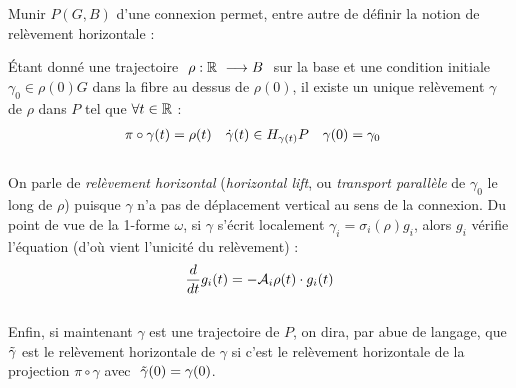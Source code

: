 Munir $P(G,B)$ d'une connexion permet, entre autre de définir la notion de relèvement horizontale :
\begin{definition}
	Étant donné une trajectoire $\ \rho : \R\ \lr B\ $ sur la base et une condition initiale $\gamma_0\in \rho(0)G$ dans la fibre au dessus de $\rho(0)$, il existe un unique relèvement $\gamma$ de $\rho$ dans $P$ tel que $\forall t\in\R$ :
	\begin{align} \label{eq:condi2hori_lift}
	\pi\circ\gamma(t) &= \rho(t)  &  \dot{\gamma}(t) &\in \hg[\gamma(t)]{P} &  \gamma(0) &= \gamma_0
	\end{align}
	\\
	On parle de \emph{relèvement horizontal} (\emph{horizontal lift}, ou \emph{transport parallèle} de $\gamma_0$ le long de $\rho$) puisque $\gamma$ n'a pas de déplacement vertical au sens de la connexion. Du point de vue de la 1-forme $\omega$, si $\gamma$ s'écrit localement $\gamma_i = \sigma_i(\rho) g_i$, alors $g_i$ vérifie l'équation (d'où vient l'unicité du relèvement) :
	\begin{equation} \label{eq:EDP2hori_lift}
		\frac{d}{dt}g_i(t)  = - \locconn_i\rho(t) \cdot g_i(t)
	\end{equation}
	\\
	Enfin, si maintenant $\gamma$ est une trajectoire de $P$, on dira, par abue de langage, que $\Tilde{\gamma}$ est le relèvement horizontale de $\gamma$ si c'est le relèvement horizontale de la projection $\pi\circ\gamma$ avec $\ \Tilde{\gamma}(0) = \gamma(0)$.
\end{definition}
\skipl


